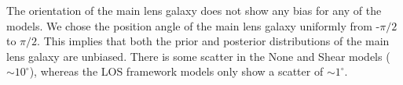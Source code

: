 The orientation of the main lens galaxy does not show any bias for any of the models. We chose the position angle of the main lens galaxy uniformly from -$\pi/2$ to $\pi/2$. This implies that both the prior and posterior distributions of the main lens galaxy are unbiased. There is some scatter in the None and Shear models ($\sim 10^\circ$), whereas the LOS framework models only show a scatter of $\sim 1^\circ$.